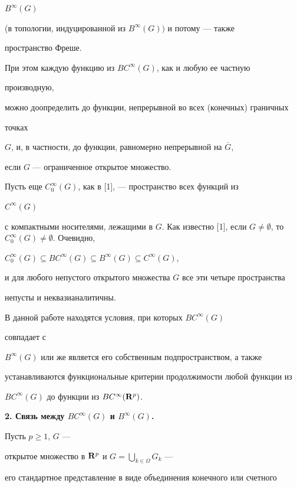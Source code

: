 $B^{\infty}(G)$


(в топологии, индуцированной из $B^{\infty}(G))$ и потому --- также


пространство Фреше.


При этом каждую функцию из $BC^{\infty}(G)$, как и любую ее частную


производную,


можно доопределить до функции, непрерывной во всех (конечных) граничных


точках


$G$, и, в частности, до функции, равномерно непрерывной на $\overline{G}$,


если $G$ --- ограниченное открытое множество.





Пусть еще $C^{\infty}_0(G)$, как в [1], --- пространство всех функций из


$C^{\infty}(G)$


с компактными носителями, лежащими в $G$. Как известно [1], если $G\neq


\emptyset$, то $C_0^{\infty}(G)\neq \emptyset$. Очевидно,


$C_0^{\infty}(G)\subseteq BC^{\infty}(G)\subseteq B^{\infty}(G)\subseteq


C^{\infty}(G)$,


и для любого непустого открытого множества $G$ все эти четыре пространства


непусты и неквазианалитичны.





В данной работе находятся условия, при которых $BC^{\infty}(G)$


совпадает с


$B^{\infty}(G)$ или же является его собственным подпространством, а также


устанавливаются функциональные критерии продолжимости любой функции из


$BC^{\infty}(G)$ до функции из $BC^{\infty}({\bold R}^p)$.


\medskip





{\bf 2. Связь между $BC^{\infty}(G)$ и $B^{\infty}(G)$.}


Пусть $p\geqslant 1$, $G$ ---


открытое множество в ${\bold R}^p$ и $G=\bigcup\limits_{k\in \Omega}G_k$ ---


его стандартное представление в виде объединения конечного или счетного


